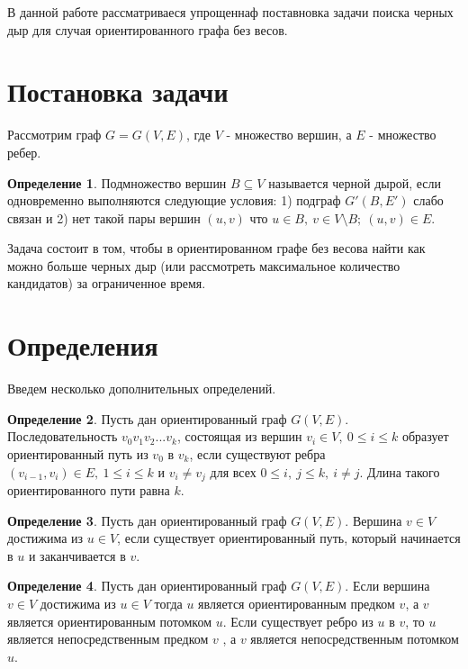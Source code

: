 \documentclass[12pt,a4paper,oneside,openany]{article}
\theoremstyle{definition}
\newtheorem{definition}{Определение}[]
\theoremstyle{lemma}
\theoremstyle{remark}
\begin{document}
В данной работе рассматриваеся упрощеннаф поставновка задачи поиска черных дыр для случая ориентированного графа без весов.

\cleardoublepage
\section{Постановка задачи}\label{sec:taskstatement}

Рассмотрим граф $G = G(V,E)$, где $V$ - множество вершин, а $E$ - множество ребер.

\begin{definition}\label{def:blackhole}
Подмножество вершин $B \subseteq V$ называется черной дырой, если одновременно выполняются следующие условия: 1) подграф $G'(B,E')$ слабо связан и 2) нет такой пары вершин $(u,v)$ что $u \in B,\ v \in V\setminus{B};\ (u,v) \in E$.
\end{definition}

Задача состоит в том, чтобы в ориентированном графе без весова найти как можно больше черных дыр (или рассмотреть максимальное количество кандидатов) за ограниченное время.

\cleardoublepage
\section{Определения}\label{sec:definitions}

Введем несколько дополнительных определений.

\begin{definition}\label{def:orpath}
Пусть дан ориентированный граф $G(V,E)$. Последовательность $v_0v_1v_2...v_k$, состоящая из вершин $v_i \in V,\ 0 \leq i \leq k$ образует ориентированный путь из $v_0$ в $v_k$, если существуют ребра $(v_{i-1}, v_i) \in E,\ 1 \leq i \leq k$ и $v_i \neq v_j$ для всех $0 \leq i,\ j \leq k,\ i \neq j$. Длина такого ориентированного пути равна $k$.
\end{definition}

\begin{definition}\label{def:reachablevertex}
Пусть дан ориентированный граф $G(V,E)$. Вершина $v \in V$ достижима из $u \in V$, если существует ориентированный путь, который начинается в $u$ и заканчивается в $v$.
\end{definition}

\begin{definition}\label{def:successor}
Пусть дан ориентированный граф $G(V,E)$. Если вершина $v \in V$ достижима из $u \in V$ тогда $u$ является ориентированным предком $v$, а $v$ является ориентированным потомком $u$. Если существует ребро из $u$ в $v$, то $u$ является непосредственным предком $v$ , а $v$ является непосредственным потомком $u$.
\end{definition}
\end{document}
